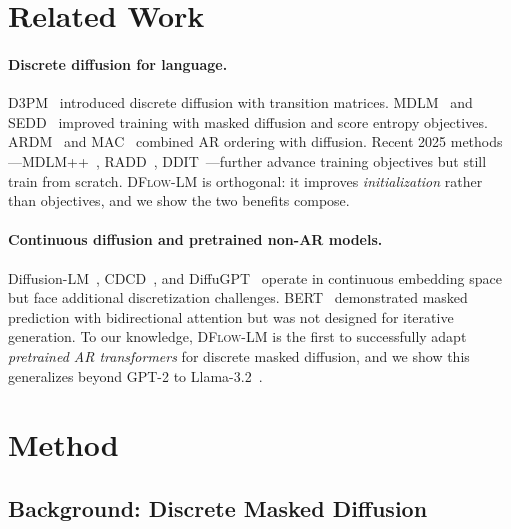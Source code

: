 \documentclass{article}
\newcommand{\ours}{\textsc{DFlow-LM}}
\begin{document}
\section{Related Work}
\label{sec:related}

\paragraph{Discrete diffusion for language.}
D3PM~\citep{austin2021structured} introduced discrete diffusion with transition matrices.
MDLM~\citep{sahoo2024simple} and SEDD~\citep{lou2024discrete} improved training with masked diffusion and score entropy objectives.
ARDM~\citep{hoogeboom2022autoregressive} and MAC~\citep{shi2024simplified} combined AR ordering with diffusion.
Recent 2025 methods---MDLM++~\citep{sahoo2025improved}, RADD~\citep{campbell2025refined}, DDIT~\citep{shi2025discrete}---further advance training objectives but still train from scratch.
\ours{} is orthogonal: it improves \emph{initialization} rather than objectives, and we show the two benefits compose.

\paragraph{Continuous diffusion and pretrained non-AR models.}
Diffusion-LM~\citep{li2022diffusion}, CDCD~\citep{dieleman2022continuous}, and DiffuGPT~\citep{gong2024diffugpt} operate in continuous embedding space but face additional discretization challenges.
BERT~\citep{devlin2019bert} demonstrated masked prediction with bidirectional attention but was not designed for iterative generation.
To our knowledge, \ours{} is the first to successfully adapt \emph{pretrained AR transformers} for discrete masked diffusion, and we show this generalizes beyond GPT-2 to Llama-3.2~\citep{grattafiori2024llama3}.

\section{Method}
\label{sec:method}

\subsection{Background: Discrete Masked Diffusion}
\label{sec:method:background}
\end{document}
